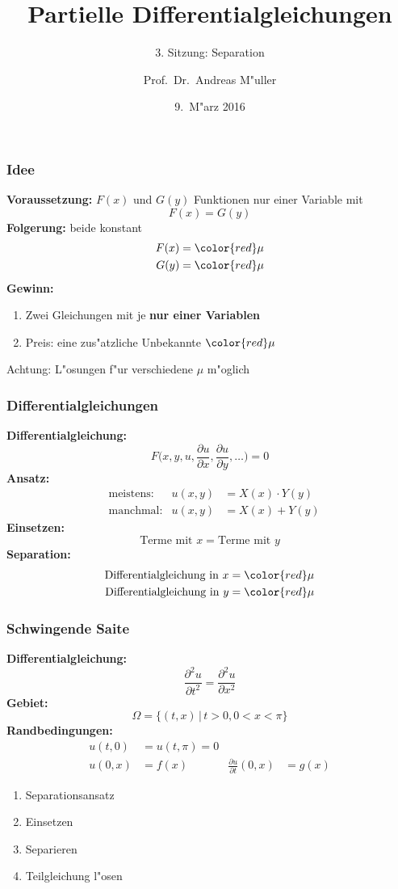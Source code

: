 \documentclass[handout]{beamer}
\title[]{Partielle Differentialgleichungen}
\subtitle{3. Sitzung: Separation}
\date[9.~M"arz 2016]{9.~M"arz 2016}
\author{Prof.~Dr.~Andreas M"uller}
\begin{document}
\begin{frame}
\titlepage

\end{frame}

\begin{frame}
\frametitle{Idee}
{\bf Voraussetzung:}
$F(x)$ und $G(y)$ Funktionen nur einer Variable mit
\[
F(x)=G(y)
\]
\pause
{\bf Folgerung:} beide konstant
\begin{align*}
F(x)&=\color{red}\mu\\
G(y)&=\color{red}\mu
\end{align*}
\pause
{\bf Gewinn:}
\begin{enumerate}
\item Zwei Gleichungen mit je {\bf nur einer Variablen}
\item Preis: eine zus"atzliche Unbekannte $\color{red}\mu$
\end{enumerate}
\pause
Achtung: L"osungen f"ur verschiedene $\mu$ m"oglich
\end{frame}

\begin{frame}
\frametitle{Differentialgleichungen}
{\bf Differentialgleichung:}
\[
F\biggl(x, y, u,
\frac{\partial u}{\partial x},
\frac{\partial u}{\partial y},\dots\biggr)=0
\]
\pause
{\bf Ansatz:}
\begin{align*}
&\text{meistens:}&
u(x,y)&=X(x)\cdot Y(y)\\
&\text{manchmal:}&
u(x,y)&=X(x) + Y(y)
\end{align*}
\pause
{\bf Einsetzen:}
\[
\text{Terme mit $x$} = \text{Terme mit $y$}
\]
\pause
{\bf Separation:}
\begin{align*}
\text{Differentialgleichung in $x$}&= \color{red}\mu\\
\text{Differentialgleichung in $y$}&= \color{red}\mu
\end{align*}
\end{frame}

\begin{frame}
\frametitle{Schwingende Saite}
{\bf Differentialgleichung:}
\[
\frac{\partial^2 u}{\partial t^2}
=
\frac{\partial^2 u}{\partial x^2}
\]
{\bf Gebiet:}
\[
\Omega = \{ (t,x) \,|\, t>0, 0<x<\pi\}
\]
{\bf Randbedingungen:}
\begin{align*}
u(t,0)&=u(t,\pi)=0\\
u(0,x)&=f(x)&\frac{\partial u}{\partial t}(0,x)&=g(x)
\end{align*}
\begin{enumerate}
\pause
\item Separationsansatz
\item Einsetzen
\item Separieren
\item Teilgleichung l"osen
\end{enumerate}
\end{frame}
\end{document}
